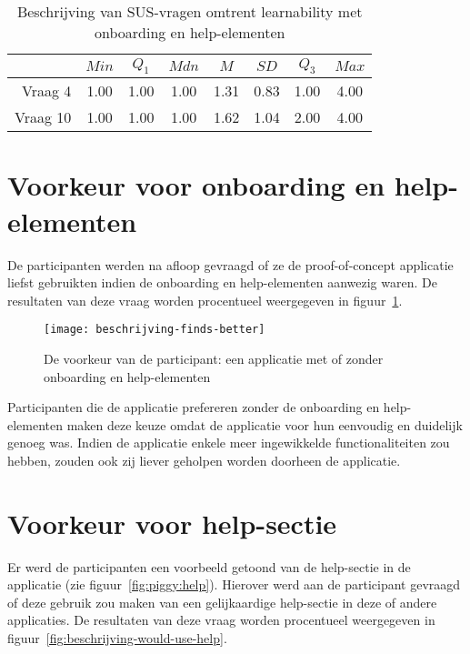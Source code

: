 \begin{table}[h]
	\centering
	\begin{tabular}{r|ccccccc}
		& $Min$ & $Q_1$ & $Mdn$ & $M$ & $SD$ & $Q_3$ & $Max$ \\ \hline
		Vraag 4 & 1.00 & 1.00 & 1.00 & 1.31 & 0.83 & 1.00 & 4.00 \\
		Vraag 10 & 1.00 & 1.00 & 1.00 & 1.62 & 1.04 & 2.00 & 4.00
	\end{tabular}
	\caption{Beschrijving van SUS-vragen omtrent learnability met onboarding en help-elementen}
	\label{tab:beschrijving-sus-learnability-2}
\end{table}

\section{Voorkeur voor onboarding en help-elementen}
\label{sec:voorkeur-onboarding}

De participanten werden na afloop gevraagd of ze de proof-of-concept applicatie liefst gebruikten indien de onboarding en help-elementen aanwezig waren. De resultaten van deze vraag worden procentueel weergegeven in figuur~\ref{fig:beschrijving-finds-better}.

\begin{figure}[h]
    \centering
    \texttt{[image: beschrijving-finds-better]}
    \caption{De voorkeur van de participant: een applicatie met of zonder onboarding en help-elementen}
    \label{fig:beschrijving-finds-better}
\end{figure}

Participanten die de applicatie prefereren zonder de onboarding en help-elementen maken deze keuze omdat de applicatie voor hun eenvoudig en duidelijk genoeg was. Indien de applicatie enkele meer ingewikkelde functionaliteiten zou hebben, zouden ook zij liever geholpen worden doorheen de applicatie.

\section{Voorkeur voor help-sectie}
\label{sec:voorkeur-help}

Er werd de participanten een voorbeeld getoond van de help-sectie in de applicatie (zie figuur~\ref{fig:piggy:help}). Hierover werd aan de participant gevraagd of deze gebruik zou maken van een gelijkaardige help-sectie in deze of andere applicaties. De resultaten van deze vraag worden procentueel weergegeven in figuur~\ref{fig:beschrijving-would-use-help}.

